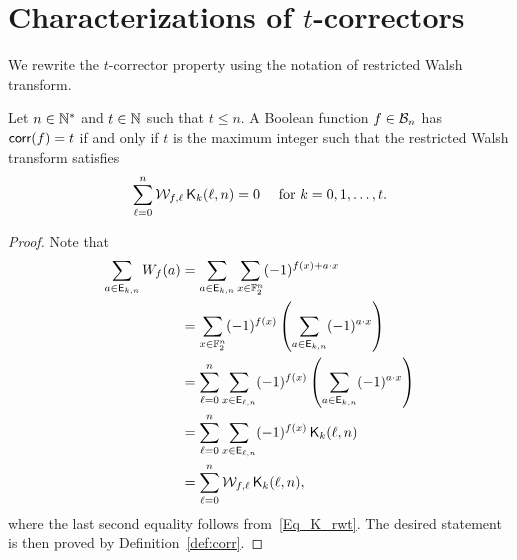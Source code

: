 \documentclass[11pt]{llncs}
\begin{document}


\section{Characterizations of $t$-correctors}\label{sec:corr}



We rewrite the $t$-corrector property using the notation of restricted Walsh transform.


\begin{theorem}\label{thm:WalsCorr}
	Let $n\in \mathbb{N}^*$ and $t\in \mathbb{N}$ such that $t\le n$. A Boolean function $f\in \mathcal{B}_{n}$ has $\mathsf{corr}(f) = t$ if and only if $t$ is the maximum integer such that the restricted Walsh transform satisfies
	\begin{equation}\label{Eq_RWT}
	\sum_{\ell=0}^{n} \mathcal{W}_{f,\ell} \, \mathsf{K}_{k}(\ell,n)=0 \quad \text{ for } k=0,1,\dots, t.
	\end{equation}


\end{theorem}
\begin{proof}

	Note that
	\begin{align*}
	\sum_{a\in \mathsf{E}_{k,n}} W_{f}(a)&=\sum_{a\in \mathsf{E}_{k,n}} \sum_{x\in \mathbb{F}_2^n} (-1)^{f(x)+a \cdot x}\\
	&= \sum_{x\in \mathbb{F}_2^n} (-1)^{f(x)}  \left(\sum_{a\in \mathsf{E}_{k,n}}(-1)^{a \cdot x}\right)\\
	&=\sum_{\ell=0}^{n} \sum_{x\in \mathsf{E}_{\ell,n}} (-1)^{f(x)}  \left(\sum_{a\in \mathsf{E}_{k,n}}(-1)^{a \cdot x}\right)\\
	&=\sum_{\ell=0}^{n} \sum_{x\in \mathsf{E}_{\ell,n}} (-1)^{f(x)} \,  \mathsf{K}_{k}(\ell,n)\\
	&=\sum_{\ell=0}^{n} \mathcal{W}_{f,\ell} \, \mathsf{K}_{k}(\ell,n),
	\end{align*}
	where the last second equality follows from~\eqref{Eq_K_rwt}.
	The desired statement is then proved by Definition~\ref{def:corr}.
\end{proof}
\end{document}
